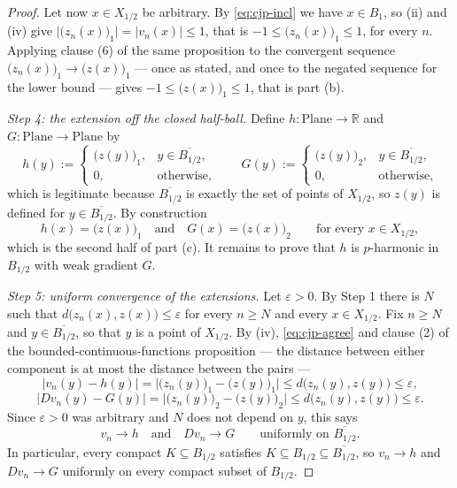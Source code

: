 \begin{proof}
Let now $x\in X_{1/2}$ be arbitrary.  By \eqref{eq:cjp-incl} we have $x\in B_1$, so (ii) and
(iv) give $\bigl\lvert\bigl(z_n(x)\bigr)_1\bigr\rvert=\lvert v_n(x)\rvert\le1$, that is
$-1\le\bigl(z_n(x)\bigr)_1\le1$, for every $n$.  Applying clause (6) of the same proposition to
the convergent sequence $\bigl(z_n(x)\bigr)_1\to\bigl(z(x)\bigr)_1$ --- once as stated, and once
to the negated sequence for the lower bound --- gives $-1\le\bigl(z(x)\bigr)_1\le1$, that is
part (b).

\medskip\noindent\emph{Step 4: the extension off the closed half-ball.}
Define $h\colon\mathrm{Plane}\to\mathbb{R}$ and $G\colon\mathrm{Plane}\to\mathrm{Plane}$ by
\[
  h(y):=\begin{cases}\bigl(z(y)\bigr)_1,&y\in\overline{B_{1/2}},\\ 0,&\text{otherwise,}\end{cases}
  \qquad
  G(y):=\begin{cases}\bigl(z(y)\bigr)_2,&y\in\overline{B_{1/2}},\\ 0,&\text{otherwise,}\end{cases}
\]
which is legitimate because $\overline{B_{1/2}}$ is exactly the set of points of $X_{1/2}$, so
$z(y)$ is defined for $y\in\overline{B_{1/2}}$.  By construction
\begin{equation}\label{eq:cjp-agree}
  h(x)=\bigl(z(x)\bigr)_1\quad\text{and}\quad G(x)=\bigl(z(x)\bigr)_2
  \qquad\text{for every }x\in X_{1/2},
\end{equation}
which is the second half of part (c).  It remains to prove that $h$ is $p$-harmonic in $B_{1/2}$
with weak gradient $G$.

\medskip\noindent\emph{Step 5: uniform convergence of the extensions.}
Let $\varepsilon>0$.  By Step 1 there is $N$ such that
$d\bigl(z_n(x),z(x)\bigr)\le\varepsilon$ for every $n\ge N$ and every $x\in X_{1/2}$.  Fix
$n\ge N$ and $y\in\overline{B_{1/2}}$, so that $y$ is a point of $X_{1/2}$.  By (iv),
\eqref{eq:cjp-agree} and clause (2) of the bounded-continuous-functions proposition --- the
distance between either component is at most the distance between the pairs ---
\[
  \lvert v_n(y)-h(y)\rvert
  =\bigl\lvert\bigl(z_n(y)\bigr)_1-\bigl(z(y)\bigr)_1\bigr\rvert
  \le d\bigl(z_n(y),z(y)\bigr)\le\varepsilon ,
\]
\[
  \lvert Dv_n(y)-G(y)\rvert
  =\bigl\lvert\bigl(z_n(y)\bigr)_2-\bigl(z(y)\bigr)_2\bigr\rvert
  \le d\bigl(z_n(y),z(y)\bigr)\le\varepsilon .
\]
Since $\varepsilon>0$ was arbitrary and $N$ does not depend on $y$, this says
\begin{equation}\label{eq:cjp-unif}
  v_n\to h\quad\text{and}\quad Dv_n\to G\qquad\text{uniformly on }\overline{B_{1/2}} .
\end{equation}
In particular, every compact $K\subseteq B_{1/2}$ satisfies
$K\subseteq B_{1/2}\subseteq\overline{B_{1/2}}$, so $v_n\to h$ and $Dv_n\to G$ uniformly on
every compact subset of $B_{1/2}$.


\end{proof}
